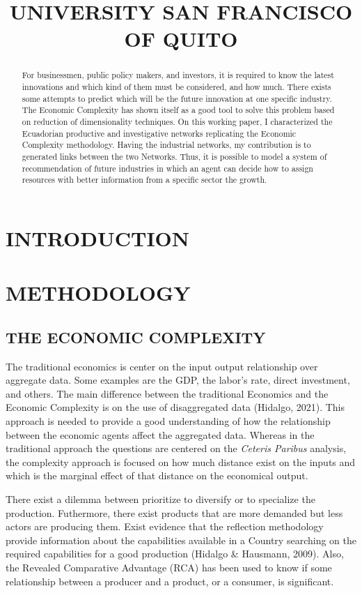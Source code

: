 \documentclass[12pt]{article}
\title{UNIVERSITY SAN FRANCISCO OF QUITO}
\begin{document}
\maketitle
\begin{abstract}

    For businessmen, public policy makers, and investors, it
is required to know the latest innovations and which
kind of them must be considered, and how much. There exists some attempts
to predict which will be the future innovation at one
specific industry. The Economic Complexity has shown itself
as a good tool to solve this problem based on reduction of
dimensionality techniques. On this working paper, 
I characterized the Ecuadorian productive and investigative
networks replicating the Economic Complexity
methodology. Having the industrial networks, my contribution 
is to generated links between the two Networks. Thus, it is 
possible to model a system of recommendation of future 
industries in which an agent can decide how to assign 
resources with better information from a specific
sector the growth.
    
\end{abstract}

\section{INTRODUCTION}

\section{METHODOLOGY}

\subsection{THE ECONOMIC COMPLEXITY}

The traditional economics is center on the input output
relationship over aggregate data. Some examples are
the GDP, the labor's rate, direct investment, and others.
The main difference between the traditional
Economics and the Economic Complexity is on the use of
disaggregated data (Hidalgo, 2021). This approach is needed
to provide a good understanding of how the relationship between
the economic agents affect the aggregated data. Whereas in the
traditional approach the questions are centered on the 
\textit{Ceteris Paribus} analysis, the complexity approach 
is focused on how much distance exist on the inputs and 
which is the marginal effect of that distance on the
economical output.

There exist a dilemma between prioritize to diversify or
to specialize the production. Futhermore, there exist
products that are more demanded but
less actors are producing them. Exist evidence that the
reflection methodology provide information about the
capabilities available in a Country searching on the required
capabilities for a good production (Hidalgo \& Hausmann, 2009).
Also, the Revealed Comparative Advantage (RCA) has been used
to know if some relationship between a producer and a product,
or a consumer, is significant.

 
\end{document}
